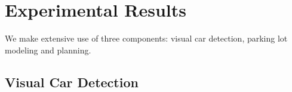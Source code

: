 
\chapter{Experimental Results}
\label{cha:experimental_results}

We make extensive use of three components: visual car detection,
parking lot modeling and planning.

\section{Visual Car Detection}
\label{sec:visual_car_detection}

\begin{figure}[p]%
\centering
{}
\\

\end{figure}

